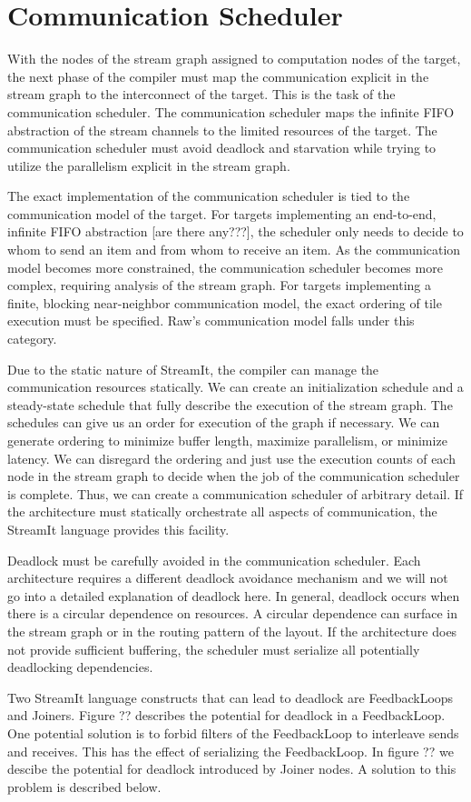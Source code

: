 \section{Communication Scheduler}
With the nodes of the stream graph assigned to computation nodes of
the target, the next phase of the compiler must map the communication
explicit in the stream graph to the interconnect of the target.  This
is the task of the communication scheduler.  The communication
scheduler maps the infinite FIFO abstraction of the stream channels to
the limited resources of the target.  The communication scheduler must
avoid deadlock and starvation while trying to utilize the parallelism
explicit in the stream graph.

The exact implementation of the communication scheduler is tied to the
communication model of the target.  For targets implementing an
end-to-end, infinite FIFO abstraction [are there any???], the
scheduler only needs to decide to whom to send an item and from whom
to receive an item.  As the communication model becomes more
constrained, the communication scheduler becomes more complex,
requiring analysis of the stream graph. For targets implementing a
finite, blocking near-neighbor communication model, the exact ordering
of tile execution must be specified.  Raw's communication model falls
under this category.

Due to the static nature of StreamIt, the compiler can manage the
communication resources statically.  We can create an initialization
schedule and a steady-state schedule that fully describe the execution
of the stream graph.  The schedules can give us an order for execution
of the graph if necessary.  We can generate ordering to minimize
buffer length, maximize parallelism, or minimize latency.  We can
disregard the ordering and just use the execution counts of each node
in the stream graph to decide when the job of the communication
scheduler is complete.  Thus, we can create a communication scheduler
of arbitrary detail.  If the architecture must statically orchestrate
all aspects of communication, the StreamIt language provides this
facility.

Deadlock must be carefully avoided in the communication
scheduler. Each architecture requires a different deadlock avoidance
mechanism and we will not go into a detailed explanation of deadlock
here.  In general, deadlock occurs when there is a circular dependence
on resources.  A circular dependence can surface in the stream graph
or in the routing pattern of the layout.  If the architecture does not
provide sufficient buffering, the scheduler must serialize all
potentially deadlocking dependencies.

Two StreamIt language constructs that can lead to deadlock are
FeedbackLoops and Joiners. Figure ?? describes the potential for
deadlock in a FeedbackLoop.  One potential solution is to forbid
filters of the FeedbackLoop to interleave sends and receives.  This
has the effect of serializing the FeedbackLoop. In figure ?? we
descibe the potential for deadlock introduced by Joiner nodes.  A
solution to this problem is described below.
